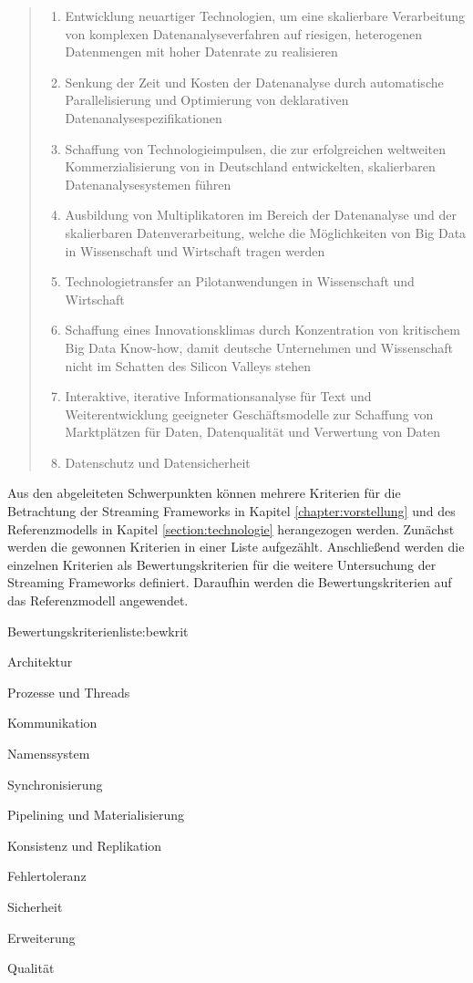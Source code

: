 \begin{quote}
	\begin{enumerate}
		\item Entwicklung neuartiger Technologien, um eine skalierbare Verarbeitung von komplexen Datenanalyseverfahren auf riesigen, heterogenen Datenmengen mit hoher Datenrate zu realisieren
		\item Senkung der Zeit und Kosten der Datenanalyse durch automatische Parallelisierung und Optimierung von deklarativen Datenanalysespezifikationen
		\item Schaffung von Technologieimpulsen, die zur erfolgreichen weltweiten Kommerzialisierung von in Deutschland entwickelten, skalierbaren Datenanalysesystemen führen
		\item Ausbildung von Multiplikatoren im Bereich der Datenanalyse und der skalierbaren Datenverarbeitung, welche die Möglichkeiten von Big Data in Wissenschaft und Wirtschaft tragen werden
		\item Technologietransfer an Pilotanwendungen in Wissenschaft und Wirtschaft
		\item Schaffung eines Innovationsklimas durch Konzentration von kritischem Big Data Know-how, damit deutsche Unternehmen und Wissenschaft nicht im Schatten des Silicon Valleys stehen
		\item Interaktive, iterative Informationsanalyse für Text und Weiterentwicklung geeigneter Geschäftsmodelle zur Schaffung von Marktplätzen für Daten, Datenqualität und Verwertung von Daten
		\item Datenschutz und Datensicherheit
	\end{enumerate}
\end{quote}

Aus den abgeleiteten Schwerpunkten können mehrere Kriterien für die Betrachtung der Streaming Frameworks in Kapitel \ref{chapter:vorstellung} und des Referenzmodells in Kapitel \ref{section:technologie} herangezogen werden. Zunächst werden die gewonnen Kriterien in einer Liste aufgezählt. Anschließend werden die einzelnen Kriterien als Bewertungskriterien für die weitere Untersuchung der Streaming Frameworks definiert. Daraufhin werden die Bewertungskriterien auf das Referenzmodell angewendet.

\begin{itemlist}{Bewertungskriterien}{liste:bewkrit}
	\item Architektur
	\item Prozesse und Threads
	\item Kommunikation
	\item Namenssystem
	\item Synchronisierung
	\item Pipelining und Materialisierung
	\item Konsistenz und Replikation	
	\item Fehlertoleranz
	\item Sicherheit	
	\item Erweiterung
	\item Qualität
\end{itemlist}

